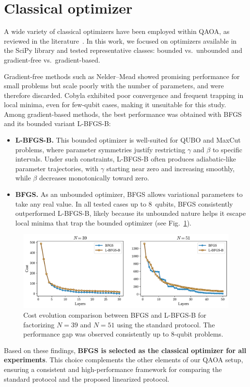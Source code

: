 \section{Classical optimizer}

A wide variety of classical optimizers have been employed within QAOA, as reviewed in the literature~\cite{blekos_review_2024}.  
In this work, we focused on optimizers available in the SciPy library and tested representative classes: bounded vs.\ unbounded and gradient-free vs.\ gradient-based.  

Gradient-free methods such as Nelder–Mead showed promising performance for small problems but scale poorly with the number of parameters, and were therefore discarded. Cobyla exhibited poor convergence and frequent trapping in local minima, even for few-qubit cases, making it unsuitable for this study. Among gradient-based methods, the best performance was obtained with BFGS and its bounded variant L-BFGS-B:

\begin{itemize}
    \item \textbf{L-BFGS-B.}  
    This bounded optimizer is well-suited for QUBO and MaxCut problems, where parameter symmetries justify restricting $\gamma$ and $\beta$ to specific intervals. Under such constraints, L-BFGS-B often produces adiabatic-like parameter trajectories, with $\gamma$ starting near zero and increasing smoothly, while $\beta$ decreases monotonically toward zero.  

    \item \textbf{BFGS.}  
    As an unbounded optimizer, BFGS allows variational parameters to take any real value. In all tested cases up to 8~qubits, BFGS consistently outperformed L-BFGS-B, likely because its unbounded nature helps it escape local minima that trap the bounded optimizer (see Fig.~\ref{fig:optimizer_comparison}).
\end{itemize}

\begin{figure}[h]
    \centering
    \includegraphics[width=1\textwidth]{03-methodology/figs/optimizer_comparison.pdf}
    \caption{Cost evolution comparison between BFGS and L-BFGS-B for factorizing $N=39$ and $N=51$ using the standard protocol. The performance gap was observed consistently up to 8-qubit problems.}
    \label{fig:optimizer_comparison}
\end{figure}

Based on these findings, \textbf{BFGS is selected as the classical optimizer for all experiments}.  
This choice complements the other elements of our QAOA setup, ensuring a consistent and high-performance framework for comparing the standard protocol and the proposed linearized protocol.
